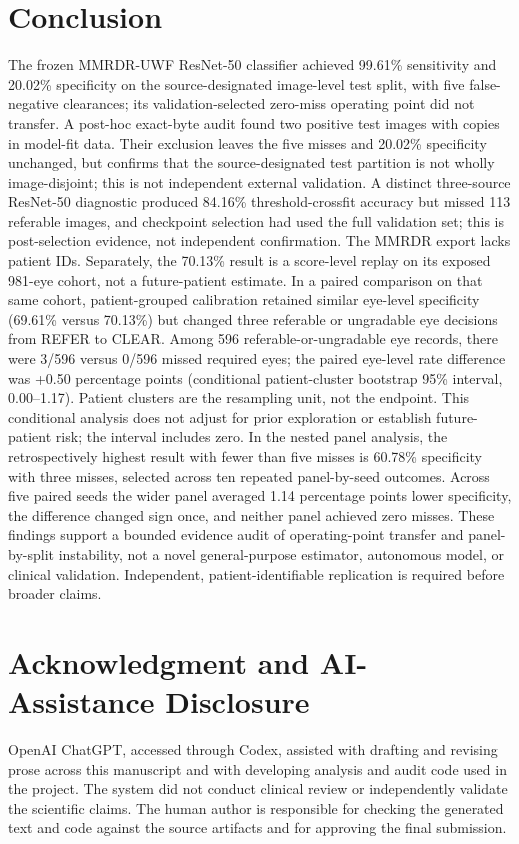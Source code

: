 \documentclass[11pt]{article}
\begin{document}
\section{Conclusion}
The frozen MMRDR-UWF ResNet-50 classifier achieved 99.61\% sensitivity and 20.02\% specificity on the source-designated image-level test split, with five false-negative clearances; its validation-selected zero-miss operating point did not transfer. A post-hoc exact-byte audit found two positive test images with copies in model-fit data. Their exclusion leaves the five misses and 20.02\% specificity unchanged, but confirms that the source-designated test partition is not wholly image-disjoint; this is not independent external validation. A distinct three-source ResNet-50 diagnostic produced 84.16\% threshold-crossfit accuracy but missed 113 referable images, and checkpoint selection had used the full validation set; this is post-selection evidence, not independent confirmation. The MMRDR export lacks patient IDs. Separately, the 70.13\% result is a score-level replay on its exposed 981-eye cohort, not a future-patient estimate. In a paired comparison on that same cohort, patient-grouped calibration retained similar eye-level specificity (69.61\% versus 70.13\%) but changed three referable or ungradable eye decisions from REFER to CLEAR. Among 596 referable-or-ungradable eye records, there were 3/596 versus 0/596 missed required eyes; the paired eye-level rate difference was +0.50 percentage points (conditional patient-cluster bootstrap 95\% interval, 0.00--1.17). Patient clusters are the resampling unit, not the endpoint. This conditional analysis does not adjust for prior exploration or establish future-patient risk; the interval includes zero. In the nested panel analysis, the retrospectively highest result with fewer than five misses is 60.78\% specificity with three misses, selected across ten repeated panel-by-seed outcomes. Across five paired seeds the wider panel averaged 1.14 percentage points lower specificity, the difference changed sign once, and neither panel achieved zero misses. These findings support a bounded evidence audit of operating-point transfer and panel-by-split instability, not a novel general-purpose estimator, autonomous model, or clinical validation. Independent, patient-identifiable replication is required before broader claims.

\section*{Acknowledgment and AI-Assistance Disclosure}
OpenAI ChatGPT, accessed through Codex, assisted with drafting and revising prose across this manuscript and with developing analysis and audit code used in the project. The system did not conduct clinical review or independently validate the scientific claims. The human author is responsible for checking the generated text and code against the source artifacts and for approving the final submission.
\end{document}
